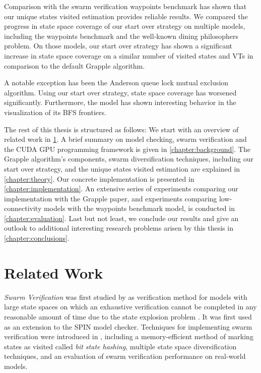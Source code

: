 \documentclass[
fancyheadings, %
%
%
]{stsreprt}
\begin{document}
Comparison with the swarm verification waypoints benchmark has shown that our unique states visited estimation provides reliable results.
We compared the progress in state space coverage of our start over strategy on multiple models, including the waypoints benchmark and the well-known dining philosophers problem.
On those models, our start over strategy has shown a significant increase in state space coverage on a similar number of visited states and VTs in comparison to the default Grapple algorithm.

A notable exception has been the Anderson queue lock mutual exclusion algorithm.
Using our start over strategy, state space coverage has worsened significantly.
Furthermore, the model has shown interesting behavior in the visualization of its BFS frontiers.

The rest of this thesis is structured as follows:
We start with an overview of related work in \cref{chapter:related-work}.
A brief summary on model checking, swarm verification and the CUDA GPU programming framework is given in \cref{chapter:background}.
The Grapple algorithm's components, swarm diversification techniques, including our start over strategy, and the unique states visited estimation are explained in \cref{chapter:theory}.
Our concrete implementation is presented in \cref{chapter:implementation}.
An extensive series of experiments comparing our implementation with the Grapple paper, and experiments comparing low-connectivity models with the waypoints benchmark model, is conducted in \cref{chapter:evaluation}.
Last but not least, we conclude our results and give an outlook to additional interesting research problems arisen by this thesis in \cref{chapter:conclusions}.

\chapter{Related Work}
\label{chapter:related-work}

\emph{Swarm Verification} was first studied by \citeauthor*{Holzmann2008.Swarm-Verification} as verification method for models with large state spaces on which an exhaustive verification cannot be completed in any reasonable amount of time due to the state explosion problem \cite{Holzmann2008.Swarm-Verification}.
It was first used as an extension to the SPIN model checker.
Techniques for implementing swarm verification were introduced in \cite{Holzmann2011.Swarm-Verification-Techniques}, including a memory-efficient method of marking states as visited called \emph{bit state hashing}, multiple state space diversification techniques, and an evaluation of swarm verification performance on real-world models.
\end{document}
